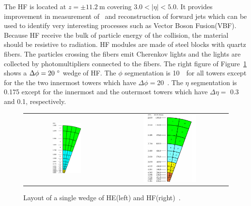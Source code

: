 The HF is located at $z = \pm 11.2~\textrm{m}$ covering $3.0 < |\eta| < 5.0$. 
It provides improvement in measurement of \met\ 
and reconstruction of forward jets which can be used to identify very interesting 
processes such as Vector Boson Fusion(VBF). %
Because HF receive the bulk of particle energy of the collision, 
the material should be resistive to radiation. 
HF modules are made of steel blocks with quartz fibers.
The particles crossing the fibers emit Cherenkov lights 
and the lights are collected by photomultipliers connected to 
the fibers. The right figure of Figure~\ref{fig:hcal_HEHF} shows 
a $\Delta \phi=20~^\circ$ wedge of HF.  
The $\phi$ segmentation is 10~\dg\ for all towers except for the 
the two innermost towers which have $\Delta \phi=$20~\dg. 
The $\eta$ segmentation is 0.175 except for the innermost 
and the outermost towers which have $\Delta \eta=$ 0.3 and 0.1, respectively. 
%
\begin{figure}[h] 
\vspace{1cm}
\centering 
\begin{tabular}{cc} 
\includegraphics[width=0.35\textwidth]{figures/Figure_005-002-a.pdf} & 
\includegraphics[width=0.47\textwidth]{figures/Figure_005-002-b.pdf} \\
\end{tabular} 
\caption{Layout of a single wedge of HE(left) and HF(right)~\cite{cmstdr1}.}
\label{fig:hcal_HEHF} 
\end{figure} 

